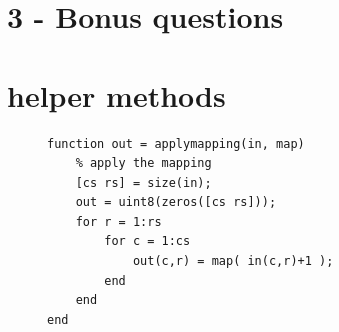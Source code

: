 \documentclass[a4paper]{article}
\begin{document}
\section*{3 - Bonus questions}

\clearpage
\appendix
\section{helper methods}
\begin{figure}[h!]
  \begin{lstlisting}[caption='applies a mapping']
function out = applymapping(in, map)
    % apply the mapping
    [cs rs] = size(in);
    out = uint8(zeros([cs rs]));
    for r = 1:rs
        for c = 1:cs
            out(c,r) = map( in(c,r)+1 );
        end
    end
end\end{lstlisting}
\end{figure}
\end{document}
